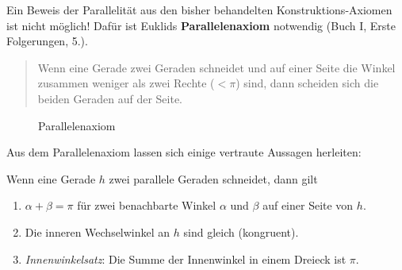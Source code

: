 Ein Beweis der Parallelität aus den bisher behandelten Konstruktions-Axiomen ist nicht möglich!
Dafür ist Euklids {\bf Parallelenaxiom} notwendig (Buch I, Erste Folgerungen, 5.).
\begin{quote}
Wenn eine Gerade %
zwei Geraden %
schneidet und auf einer Seite die Winkel
zusammen weniger als zwei Rechte ($<\pi$) sind, dann scheiden sich die beiden Geraden auf der Seite.
\end{quote}

\begin{center}
    \begin{figure}[h]
        
        \caption{Parallelenaxiom}
    \end{figure}
\end{center}

Aus dem Parallelenaxiom lassen sich einige vertraute Aussagen herleiten:

\begin{thm}
    Wenn eine Gerade $h$ zwei parallele Geraden %
    schneidet, dann gilt
    \begin{enumerate}
        \item $\alpha + \beta = \pi$ für zwei benachbarte Winkel $\alpha$ und $\beta$  auf einer
        Seite von $h$.
        \item Die inneren Wechselwinkel an $h$ sind gleich (kongruent).
        \item {\em Innenwinkelsatz}: Die Summe der Innenwinkel in einem Dreieck ist $\pi$.
    \end{enumerate}
\end{thm}

